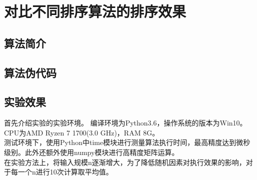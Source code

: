 \documentclass[UTF8]{ctexart}
\begin{document}




\section{对比不同排序算法的排序效果}

\subsection{算法简介}



\subsection{算法伪代码}



\subsection{实验效果}
首先介绍实验的实验环境。
编译环境为Python3.6，操作系统的版本为Win10。
CPU为AMD Ryzen 7 1700(3.0 GHz)，RAM 8G。\\
测试环境下，使用Python中time模块进行测量算法执行时间，最高精度达到微秒级别。此外还额外使用numpy模块进行高精度矩阵运算。\\
在实验方法上，将输入规模n逐渐增大，为了降低随机因素对执行效果的影响，对于每一个n进行10次计算取平均值。\\
\end{document}

